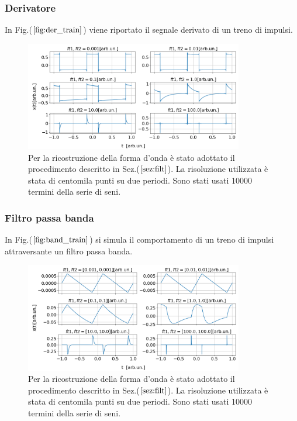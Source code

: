 \documentclass{article}
\begin{document}
            \subsubsection{Derivatore}
                In Fig.($\ref{fig:der_train}$) viene riportato il segnale derivato di un treno di impulsi.     
                    
                    \begin{figure}[H]
                        \centering
                        \includegraphics[width=0.85\textwidth]{der_train.png} %
                        \caption{Per la ricostruzione della forma d'onda è stato adottato 
                        il procedimento descritto in Sez.($\ref{sez:filt}$).
                        La risoluzione utilizzata è stata di centomila punti su due periodi.
                        Sono stati usati 10000 termini della serie di seni.}
                        \label{fig:der_train}
                    \end{figure}    

            \subsubsection{Filtro passa banda}
                In Fig.($\ref{fig:band_train}$) si simula il comportamento di un treno di impulsi
                attraversante un filtro passa banda.
                \begin{figure}[H]
                    \centering
                    \includegraphics[width=0.85\textwidth]{band_train.png} %
                    \caption{Per la ricostruzione della forma d'onda è stato adottato 
                    il procedimento descritto in Sez.($\ref{sez:filt}$).
                    La risoluzione utilizzata è stata di centomila punti su due periodi.
                    Sono stati usati 10000 termini della serie di seni.}
                    \label{fig:band_train}
                \end{figure}
\end{document}
